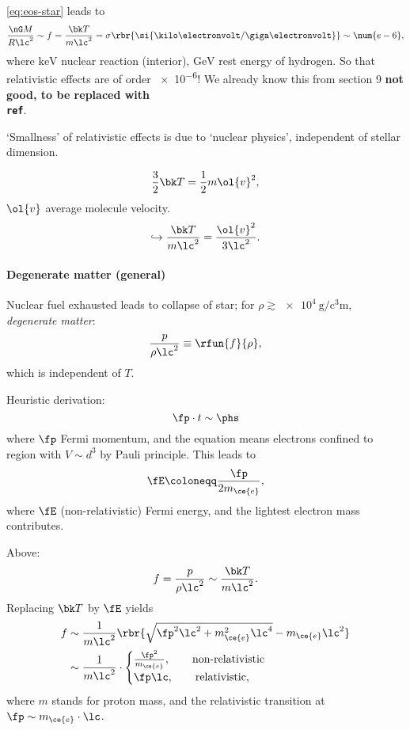 \eqref{eq:eos-star} leads to
\begin{equation}
\frac{\nG M}{R \lc^2} \sim f = \frac{\bk T}{m \lc^2} = \sigma
\rbr{\si{\kilo\electronvolt/\giga\electronvolt}}\sim\num{e-6},
\end{equation}
where $\si{\kilo\electronvolt}$ nuclear reaction (interior),
$\si{\giga\electronvolt}$ rest energy of hydrogen. So that relativistic
effects are of order \num{e-6}! We already know this from section 9
\textbf{not good, to be replaced with \texttt{\\ref}}.

`Smallness' of relativistic effects is due to `nuclear physics', independent
of stellar dimension.

\begin{equation}
\frac{3}{2} \bk T = \frac{1}{2} m \ol{v}^2,
\end{equation}
$\ol{v}$ average molecule velocity.
\begin{equation}
\hookrightarrow \frac{\bk T}{m\lc^2} = \frac{\ol{v}^2}{3\lc^2}.
\end{equation}

\paragraph{Degenerate matter (general)}
Nuclear fuel exhausted leads to collapse of star; for $\rho \gtrsim
\SI{e4}{\gram\per\cubic\centi\metre}$, \emph{degenerate matter}:
\begin{equation}
\frac{p}{\rho\lc^2} \equiv \rfun{f}{\rho},
\end{equation}
which is independent of $T$.

Heuristic derivation:
\begin{equation}
\fp \cdot t \sim \phs
\label{eq:heis-fp}
\end{equation}
where $\fp$
Fermi momentum, and the equation means electrons confined to region with
$V\sim d^3$ by Pauli principle. This leads to
\begin{equation}
\fE \coloneqq \frac{\fp}{2m_{\ce{e}}},
\end{equation}
where $\fE$ (non-relativistic) Fermi energy, and the lightest electron mass
contributes.

Above:
\begin{equation}
f = \frac{p}{\rho\lc^2} \sim \frac{\bk T}{m\lc^2}.
\end{equation}
Replacing $\bk T$ by $\fE$ yields
\begin{align}
f &\sim\frac{1}{m\lc^2}\rbr{\sqrt{\fp^2\lc^2+m_{\ce{e}}^2\lc^4}
-m_{\ce{e}} \lc^2} \\
&\sim \frac{1}{m\lc^2}\cdot
\begin{cases}
\frac{\fp^2}{m_{\ce{e}}},\qquad\text{non-relativistic} \\
\fp\lc,\qquad\text{relativistic},
\end{cases}
\end{align}
where $m$ stands for proton mass, and the relativistic transition at
$\fp \sim m_{\ce{e}}\cdot\lc$.

